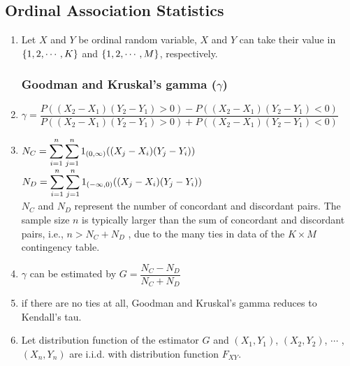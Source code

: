 \subsection{Ordinal Association Statistics}


\begin{enumerate}
    \item Let $X$ and $Y$ be ordinal random variable, $X$ and $Y$ can take their value in $\left\{1, 2, \cdots , K \right\}$ and $\left\{1, 2, \cdots , M\right\}$, respectively.
    \hfill \cite{statistics/book/Statistics-for-Data-Scientists/Maurits-Kaptein}

\subsubsection{Goodman and Kruskal’s gamma ($\gamma$)}

    \item
    $
        \gamma
        = \dfrac{
            P((X_2 - X_1)(Y_2 - Y_1) > 0) - P((X_2 - X_1)(Y_2 - Y_1) < 0)
        }{
            P((X_2 - X_1)(Y_2 - Y_1) > 0) + P((X_2 - X_1)(Y_2 - Y_1) < 0)
        }
    $
    \hfill \cite{statistics/book/Statistics-for-Data-Scientists/Maurits-Kaptein}

    \item
    $ N_C = \displaystyle\sum^n_{i=1} \displaystyle\sum^n_{j=1} 1_{(0,\infty)} ((X_j - X_i )(Y_j - Y_i )) $
    \hfill
    $ N_D = \displaystyle\sum^n_{i=1} \displaystyle\sum^n_{j=1} 1_{(-\infty, 0)} ((X_j - X_i )(Y_j - Y_i )) $
    \hfill \cite{statistics/book/Statistics-for-Data-Scientists/Maurits-Kaptein}
    \\[0.3cm]
    $N_C$ and $N_D$ represent the number of concordant and discordant pairs.
    The sample size $n$ is typically larger than the sum of concordant and discordant pairs, i.e., $n > N_C + N_D$ , due to the many ties in data of the $K \times M$ contingency table.
    \hfill \cite{statistics/book/Statistics-for-Data-Scientists/Maurits-Kaptein}

    \item $\gamma$ can be estimated by $G = \dfrac{N_C - N_D}{N_C + N_D}$
    \hfill \cite{statistics/book/Statistics-for-Data-Scientists/Maurits-Kaptein}

    \item if there are no ties at all, Goodman and Kruskal’s gamma reduces to Kendall’s tau.
    \hfill \cite{statistics/book/Statistics-for-Data-Scientists/Maurits-Kaptein}

    \item Let distribution function of the estimator $G$ and $(X_1, Y_1)$, $(X_2, Y_2)$, $\cdots$ , $(X_n , Y_n )$ are i.i.d. with distribution function $F_{X Y }$.
    \hfill \cite{statistics/book/Statistics-for-Data-Scientists/Maurits-Kaptein}


\end{enumerate}

